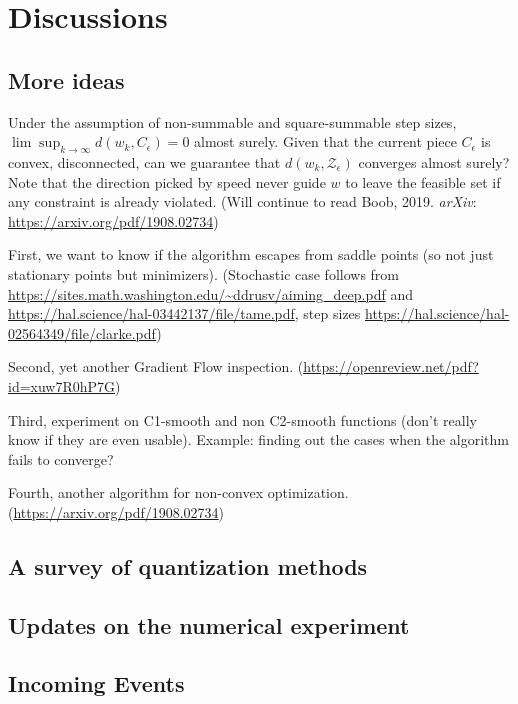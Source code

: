 \documentclass[10pt,a4paper]{article}
\begin{document}
\newpage
\section{Discussions}

\subsection{More ideas}
Under the assumption of non-summable and square-summable step sizes, $\lim\sup_{k\to\infty} d(w_k, C_\epsilon)=0$ almost surely. Given that the current piece $C_\epsilon$ is convex, disconnected, can we guarantee that $d(w_k, \mathcal{Z}_{\epsilon})$ converges almost surely? Note that the direction picked by speed never guide $w$ to leave the feasible set if any constraint is already violated.  (Will continue to read Boob, 2019. \textit{arXiv}: \url{https://arxiv.org/pdf/1908.02734})

First, we want to know if the algorithm escapes from saddle points (so not just stationary points but minimizers). (Stochastic case follows from \url{https://sites.math.washington.edu/~ddrusv/aiming_deep.pdf} and \url{https://hal.science/hal-03442137/file/tame.pdf}, step sizes \url{https://hal.science/hal-02564349/file/clarke.pdf})

Second, yet another Gradient Flow inspection. (\url{https://openreview.net/pdf?id=xuw7R0hP7G})

Third, experiment on C1-smooth and non C2-smooth functions (don't really know if they are even usable). Example: finding out the cases when the algorithm fails to converge?

Fourth, another algorithm for non-convex optimization. (\url{https://arxiv.org/pdf/1908.02734})

\subsection{A survey of quantization methods}

\subsection{Updates on the numerical experiment}

\subsection{Incoming Events}
\end{document}
